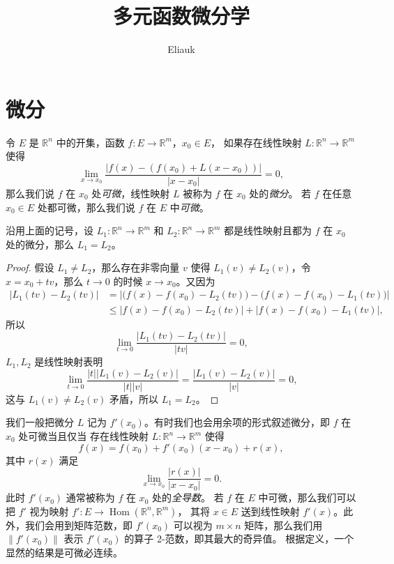 \documentclass[fontset=none,zihao=-4]{Notes}
\title{\sffamily 多元函数微分学}
\author{Eliauk}
\DeclareMathOperator\Hom{Hom}
\newcommand{\norm}[1]{\left\lVert#1\right\rVert}
\newcommand{\abs}[1]{\left\lvert#1\right\rvert}
\begin{document}
\maketitle

\tableofcontents

\section{微分}

令 $E$ 是 $\mathbb{R}^n$ 中的开集，函数 $f:E\to\mathbb{R}^m$，$x_0\in E$，
如果存在线性映射 $L:\mathbb{R}^n\to\mathbb{R}^m$ 使得
\[
  \lim_{x\to x_0}\frac{\abs{f(x)-(f(x_0)+L(x-x_0))}}{\abs{x-x_0}}=0,
\]
那么我们说 $f$ 在 $x_0$ 处\emph{可微}，线性映射 $L$ 被称为 $f$ 在 $x_0$ 处的\emph{微分}。
若 $f$ 在任意 $x_0\in E$ 处都可微，那么我们说 $f$ 在 $E$ 中\emph{可微}。

\begin{theorem}[微分的唯一性]
  沿用上面的记号，设 $L_1:\mathbb{R}^n\to\mathbb{R}^m$ 和 $L_2:\mathbb{R}^n\to\mathbb{R}^m$
  都是线性映射且都为 $f$ 在 $x_0$ 处的微分，那么 $L_1=L_2$。
\end{theorem}
\begin{proof}
  假设 $L_1\neq L_2$，那么存在非零向量 $v$ 使得 $L_1(v)\neq L_2(v)$，令
  $x=x_0+tv$，那么 $t\to 0$ 的时候 $x\to x_0$。又因为
  \begin{align*}
    \abs{L_1(tv)-L_2(tv)}&=\abs{\bigl(f(x)-f(x_0)-L_2(tv)\bigr)-\bigl(f(x)-f(x_0)-L_1(tv)\bigr)}\\
    &\leq\abs{f(x)-f(x_0)-L_2(tv)}+\abs{f(x)-f(x_0)-L_1(tv)},
  \end{align*}
  所以
  \[
    \lim_{t\to 0}\frac{\abs{L_1(tv)-L_2(tv)}}{\abs{tv}}=0,  
  \]
  $L_1,L_2$ 是线性映射表明
  \[
    \lim_{t\to 0}\frac{|t|\abs{L_1(v)-L_2(v)}}{|t|\abs{v}}=\frac{\abs{L_1(v)-L_2(v)}}{\abs{v}}=0,  
  \]
  这与 $L_1(v)\neq L_2(v)$ 矛盾，所以 $L_1=L_2$。
\end{proof}

我们一般把微分 $L$ 记为 $f'(x_0)$。有时我们也会用余项的形式叙述微分，即 $f$ 在 $x_0$ 处可微当且仅当
存在线性映射 $L:\mathbb{R}^n\to\mathbb{R}^m$ 使得
\[
  f(x)=f(x_0)+f'(x_0)(x-x_0)+r(x),
\]
其中 $r(x)$ 满足 
\[
  \lim_{x\to x_0}\frac{\abs{r(x)}}{\abs{x-x_0}}=0.  
\]
此时 $f'(x_0)$ 通常被称为 $f$ 在 $x_0$ 处的\emph{全导数}。
若 $f$ 在 $E$ 中可微，那么我们可以把 $f'$ 视为映射 $f':E\to\Hom(\mathbb{R}^n,\mathbb{R}^m)$，
其将 $x\in E$ 送到线性映射 $f'(x)$。此外，我们会用到矩阵范数，即
$f'(x_0)$ 可以视为 $m\times n$ 矩阵，那么我们用 $\norm{f'(x_0)}$
表示 $f'(x_0)$ 的算子 2-范数，即其最大的奇异值。
根据定义，一个显然的结果是可微必连续。
\end{document}
